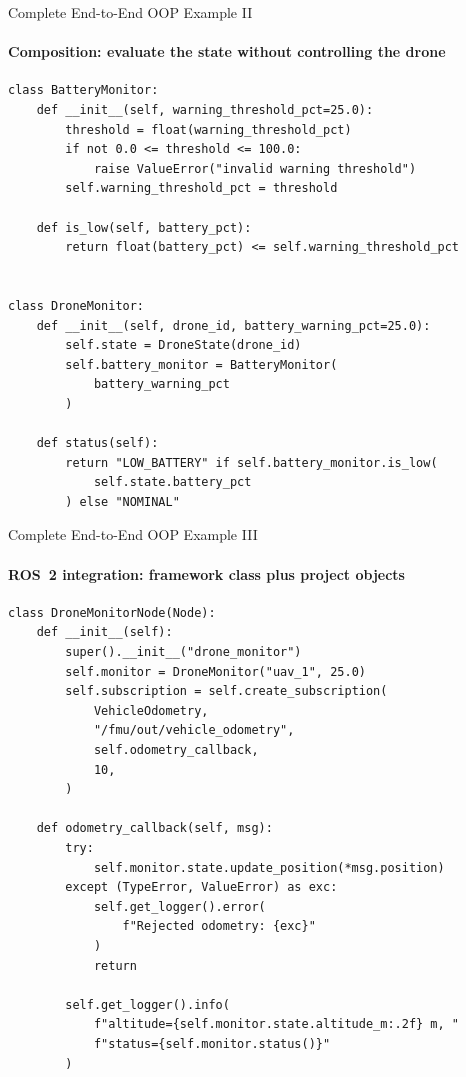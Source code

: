 \begin{frame}[fragile]{Complete End-to-End OOP Example II}
\framesubtitle{Composition: evaluate the state without controlling the drone}

\scriptsize
\begin{verbatim}
class BatteryMonitor:
    def __init__(self, warning_threshold_pct=25.0):
        threshold = float(warning_threshold_pct)
        if not 0.0 <= threshold <= 100.0:
            raise ValueError("invalid warning threshold")
        self.warning_threshold_pct = threshold

    def is_low(self, battery_pct):
        return float(battery_pct) <= self.warning_threshold_pct


class DroneMonitor:
    def __init__(self, drone_id, battery_warning_pct=25.0):
        self.state = DroneState(drone_id)
        self.battery_monitor = BatteryMonitor(
            battery_warning_pct
        )

    def status(self):
        return "LOW_BATTERY" if self.battery_monitor.is_low(
            self.state.battery_pct
        ) else "NOMINAL"
\end{verbatim}
\end{frame}


\begin{frame}[fragile]{Complete End-to-End OOP Example III}
\framesubtitle{ROS~2 integration: framework class plus project objects}

\scriptsize
\begin{verbatim}
class DroneMonitorNode(Node):
    def __init__(self):
        super().__init__("drone_monitor")
        self.monitor = DroneMonitor("uav_1", 25.0)
        self.subscription = self.create_subscription(
            VehicleOdometry,
            "/fmu/out/vehicle_odometry",
            self.odometry_callback,
            10,
        )

    def odometry_callback(self, msg):
        try:
            self.monitor.state.update_position(*msg.position)
        except (TypeError, ValueError) as exc:
            self.get_logger().error(
                f"Rejected odometry: {exc}"
            )
            return

        self.get_logger().info(
            f"altitude={self.monitor.state.altitude_m:.2f} m, "
            f"status={self.monitor.status()}"
        )
\end{verbatim}
\end{frame}


